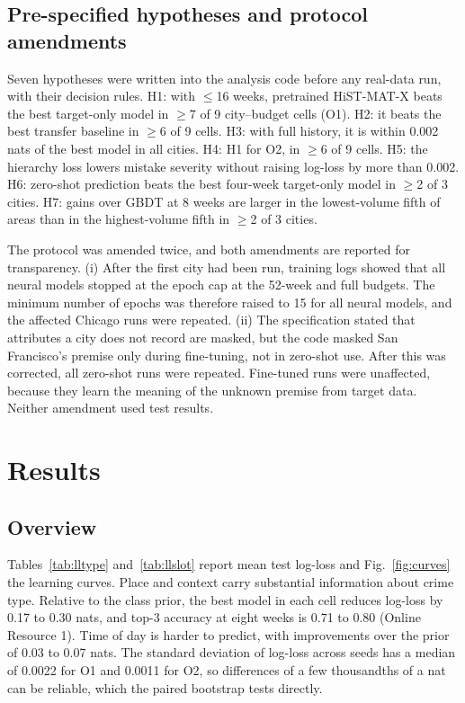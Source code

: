 \documentclass[11pt]{article}
\newcommand{\HMX}{HiST-MAT-X}
\begin{document}
\subsection{Pre-specified hypotheses and protocol amendments}
Seven hypotheses were written into the analysis code before any real-data run, with their decision rules. H1: with $\le$16 weeks, pretrained \HMX{} beats the best target-only model in $\ge$7 of 9 city--budget cells (O1). H2: it beats the best transfer baseline in $\ge$6 of 9 cells. H3: with full history, it is within 0.002 nats of the best model in all cities. H4: H1 for O2, in $\ge$6 of 9 cells. H5: the hierarchy loss lowers mistake severity without raising log-loss by more than 0.002. H6: zero-shot prediction beats the best four-week target-only model in $\ge$2 of 3 cities. H7: gains over GBDT at 8 weeks are larger in the lowest-volume fifth of areas than in the highest-volume fifth in $\ge$2 of 3 cities.

The protocol was amended twice, and both amendments are reported for transparency. (i) After the first city had been run, training logs showed that all neural models stopped at the epoch cap at the 52-week and full budgets. The minimum number of epochs was therefore raised to 15 for all neural models, and the affected Chicago runs were repeated. (ii) The specification stated that attributes a city does not record are masked, but the code masked San Francisco's premise only during fine-tuning, not in zero-shot use. After this was corrected, all zero-shot runs were repeated. Fine-tuned runs were unaffected, because they learn the meaning of the unknown premise from target data. Neither amendment used test results.

\section{Results}\label{sec:results}

\subsection{Overview}
Tables~\ref{tab:lltype} and~\ref{tab:llslot} report mean test log-loss and Fig.~\ref{fig:curves} the learning curves. Place and context carry substantial information about crime type. Relative to the class prior, the best model in each cell reduces log-loss by 0.17 to 0.30 nats, and top-3 accuracy at eight weeks is 0.71 to 0.80 (Online Resource 1). Time of day is harder to predict, with improvements over the prior of 0.03 to 0.07 nats. The standard deviation of log-loss across seeds has a median of 0.0022 for O1 and 0.0011 for O2, so differences of a few thousandths of a nat can be reliable, which the paired bootstrap tests directly.
\end{document}
